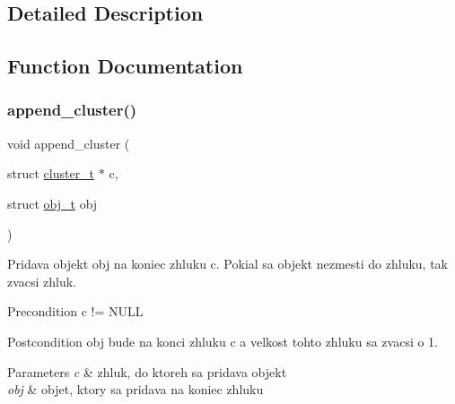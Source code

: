 \subsection{Detailed Description}


\subsection{Function Documentation}
\mbox{\label{group__clust_gab6269b64b2c7f4842a51c58b2d86a2e5}} 
\subsubsection{\texorpdfstring{append\+\_\+cluster()}{append\_cluster()}}
{\footnotesize\ttfamily void append\+\_\+cluster (\begin{DoxyParamCaption}\item[{struct \hyperlink{structcluster__t}{cluster\+\_\+t} $\ast$}]{c,  }\item[{struct \hyperlink{structobj__t}{obj\+\_\+t}}]{obj }\end{DoxyParamCaption})}

Pridava objekt \textquotesingle{}obj\textquotesingle{} na koniec zhluku \textquotesingle{}c\textquotesingle{}. Pokial sa objekt nezmesti do zhluku, tak zvacsi zhluk.

\begin{DoxyPrecond}{Precondition}
c != N\+U\+LL
\end{DoxyPrecond}
\begin{DoxyPostcond}{Postcondition}
\textquotesingle{}obj\textquotesingle{} bude na konci zhluku \textquotesingle{}c\textquotesingle{} a velkost tohto zhluku sa zvacsi o 1.
\end{DoxyPostcond}

\begin{DoxyParams}{Parameters}
{\em c} & zhluk, do ktoreh sa pridava objekt \\
\hline
{\em obj} & objet, ktory sa pridava na koniec zhluku \\
\hline
\end{DoxyParams}
\mbox{\label{group__clust_ga8289f092f205baeb13cf33cfffa15324}} 
